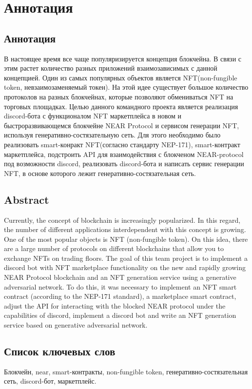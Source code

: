\section{Аннотация}

\subsection{Аннотация}

В настоящее время все чаще популяризируется концепция блокчейна. В связи с этим растет количество разных приложений взаимозависимых с данной концепцией. Один из самых популярных объектов является NFT(non-fungible token, невзаимозаменяемый токен). На этой идее существует большое количество протоколов на разных блокчейнах, которые позволяют обмениваться NFT на торговых площадках. Целью данного командного проекта является реализация discord-бота с функционалом NFT маркетплейса в новом и быстроразвивающемся блокчейне NEAR Protocol и сервисом генерации NFT, используя генеративно-состязательную сеть. Для этого необходимо было реализовать smart-конракт NFT(согласно стандарту NEP-171), smart-контракт маркетплейса, подстроить API для взаимодействия с блокченом NEAR-protocol под возможности discord, реализовать discord-бота и написать сервис генерации NFT, в основе которого лежит генеративно-состязательная сеть.

\subsection{Abstract}
Currently, the concept of blockchain is increasingly popularized. In this regard, the number of different applications interdependent with this concept is growing. One of the most popular objects is NFT (non-fungible token). On this idea, there are a large number of protocols on different blockchains that allow you to exchange NFTs on trading floors. The goal of this team project is to implement a discord bot with NFT marketplace functionality on the new and rapidly growing NEAR Protocol blockchain and an NFT generation service using a generative adversarial network. To do this, it was necessary to implement an NFT smart contract (according to the NEP-171 standard), a marketplace smart contract, adjust the API for interacting with the blocked NEAR protocol under the capabilities of discord, implement a discord bot and write an NFT generation service based on generative adversarial network.

\subsection{Список ключевых слов}
Блокчейн, near, smart-контракты, non-fungible token, генеративно-состязательная сеть, discord-бот, маркетплейс.

\newpage
